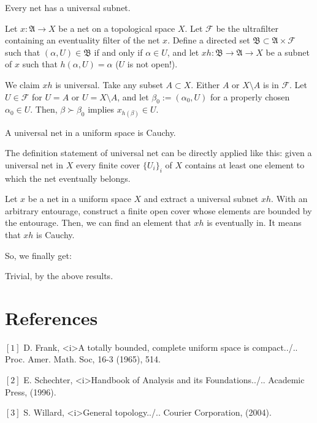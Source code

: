 \documentclass[11pt]{amsart}
\begin{document}
\begin{thm}
Every net has a universal subnet.
\end{thm}
\begin{pf}
Let $x:\mathfrak{A}\to X$ be a net on a topological space $X$.
Let $\mathcal{F}$ be the ultrafilter containing an eventuality filter of the net $x$.
Define a directed set $\mathfrak{B}\subset\mathfrak{A}\times\mathcal{F}$ such that $(\alpha,U)\in\mathfrak{B}$ if and only if $\alpha\in U$, and let $xh:\mathfrak{B}\to\mathfrak{A}\to X$ be a subnet of $x$ such that $h(\alpha,U)=\alpha$ ($U$ is not open!).

We claim $xh$ is universal.
Take any subset $A\subset X$.
Either $A$ or $X\setminus A$ is in $\mathcal{F}$.
Let $U\in\mathcal{F}$ for $U=A$ or $U=X\setminus A$, and let $\beta_0:=(\alpha_0,U)$ for a properly chosen $\alpha_0\in U$.
Then, $\beta\succ\beta_0$ implies $x_{h(\beta)}\in U$.
\end{pf}

\begin{thm}
A universal net in a uniform space is Cauchy.
\end{thm}
\begin{pf}
The definition statement of universal net can be directly applied like this: given a universal net in $X$ every finite cover $\{U_i\}_i$ of $X$ contains at least one element to which the net eventually belongs.

Let $x$ be a net in a uniform space $X$ and extract a universal subnet $xh$.
With an arbitrary entourage, construct a finite open cover whose elements are bounded by the entourage.
Then, we can find an element that $xh$ is eventually in.
It means that $xh$ is Cauchy.
\end{pf}

So, we finally get:

\begin{pf}[3 of Theorem 1.1.]
Trivial, by the above results.
\end{pf}


\section*{References}

$[1]$ D. Frank, <i>A totally bounded, complete uniform space is compact../.. Proc. Amer. Math. Soc, 16-3 (1965), 514.

$[2]$ E. Schechter, <i>Handbook of Analysis and its Foundations../.. Academic Press, (1996).

$[3]$ S. Willard, <i>General topology../.. Courier Corporation, (2004).
\end{document}
